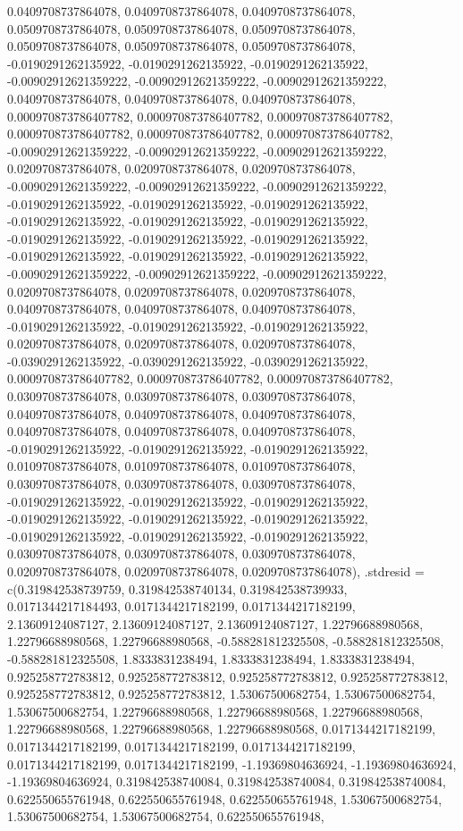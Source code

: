 \documentclass[
  ,man]{apa6}
\begin{document}
0.0409708737864078, 0.0409708737864078, 0.0409708737864078, 0.0509708737864078, 0.0509708737864078, 0.0509708737864078, 0.0509708737864078, 0.0509708737864078, 0.0509708737864078, -0.0190291262135922, -0.0190291262135922, -0.0190291262135922, -0.00902912621359222, -0.00902912621359222, -0.00902912621359222, 0.0409708737864078, 0.0409708737864078, 0.0409708737864078, 0.000970873786407782, 0.000970873786407782, 0.000970873786407782, 0.000970873786407782, 0.000970873786407782, 0.000970873786407782,
-0.00902912621359222, -0.00902912621359222, -0.00902912621359222, 0.0209708737864078, 0.0209708737864078, 0.0209708737864078, -0.00902912621359222, -0.00902912621359222, -0.00902912621359222, -0.0190291262135922, -0.0190291262135922, -0.0190291262135922, -0.0190291262135922, -0.0190291262135922, -0.0190291262135922, -0.0190291262135922, -0.0190291262135922, -0.0190291262135922, -0.0190291262135922, -0.0190291262135922, -0.0190291262135922, -0.00902912621359222, -0.00902912621359222, -0.00902912621359222,
0.0209708737864078, 0.0209708737864078, 0.0209708737864078, 0.0409708737864078, 0.0409708737864078, 0.0409708737864078, -0.0190291262135922, -0.0190291262135922, -0.0190291262135922, 0.0209708737864078, 0.0209708737864078, 0.0209708737864078, -0.0390291262135922, -0.0390291262135922, -0.0390291262135922, 0.000970873786407782, 0.000970873786407782, 0.000970873786407782, 0.0309708737864078, 0.0309708737864078, 0.0309708737864078, 0.0409708737864078, 0.0409708737864078, 0.0409708737864078, 0.0409708737864078,
0.0409708737864078, 0.0409708737864078, -0.0190291262135922, -0.0190291262135922, -0.0190291262135922, 0.0109708737864078, 0.0109708737864078, 0.0109708737864078, 0.0309708737864078, 0.0309708737864078, 0.0309708737864078, -0.0190291262135922, -0.0190291262135922, -0.0190291262135922, -0.0190291262135922, -0.0190291262135922, -0.0190291262135922, -0.0190291262135922, -0.0190291262135922, -0.0190291262135922, 0.0309708737864078, 0.0309708737864078, 0.0309708737864078, 0.0209708737864078, 0.0209708737864078,
0.0209708737864078), .stdresid = c(0.319842538739759, 0.319842538740134, 0.319842538739933, 0.0171344217184493, 0.0171344217182199, 0.0171344217182199, 2.13609124087127, 2.13609124087127, 2.13609124087127, 1.22796688980568, 1.22796688980568, 1.22796688980568, -0.588281812325508, -0.588281812325508, -0.588281812325508, 1.8333831238494, 1.8333831238494, 1.8333831238494, 0.925258772783812, 0.925258772783812, 0.925258772783812, 0.925258772783812, 0.925258772783812, 0.925258772783812, 1.53067500682754,
1.53067500682754, 1.53067500682754, 1.22796688980568, 1.22796688980568, 1.22796688980568, 1.22796688980568, 1.22796688980568, 1.22796688980568, 0.0171344217182199, 0.0171344217182199, 0.0171344217182199, 0.0171344217182199, 0.0171344217182199, 0.0171344217182199, -1.19369804636924, -1.19369804636924, -1.19369804636924, 0.319842538740084, 0.319842538740084, 0.319842538740084, 0.622550655761948, 0.622550655761948, 0.622550655761948, 1.53067500682754, 1.53067500682754, 1.53067500682754, 0.622550655761948,
\end{document}
